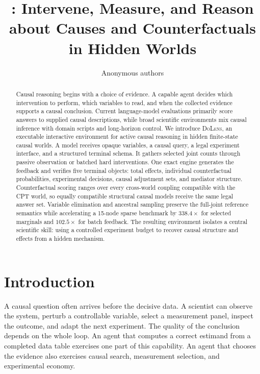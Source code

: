 \documentclass{article}
\title{\method: Intervene, Measure, and Reason\\
about Causes and Counterfactuals\\
in Hidden Worlds}
\author{Anonymous authors}
\newcommand{\method}{\textsc{DoLens}}
\begin{document}
\maketitle

\begin{abstract}
Causal reasoning begins with a choice of evidence. A capable agent decides which
intervention to perform, which variables to read, and when the collected evidence
supports a causal conclusion. Current language-model evaluations primarily score
answers to supplied causal descriptions, while broad scientific environments mix
causal inference with domain scripts and long-horizon control. We introduce
\method, an executable interactive environment for active causal reasoning in
hidden finite-state causal worlds. A model receives opaque variables, a causal
query, a legal
experiment interface, and a structured terminal schema. It gathers selected joint
counts through passive observation or batched hard interventions. One exact engine
generates the feedback and verifies five terminal objects: total effects,
individual counterfactual probabilities, experimental decisions, causal adjustment sets,
and mediator structure. Counterfactual scoring ranges over every cross-world
coupling compatible with the CPT world, so equally compatible structural causal
models receive the same legal answer set. Variable elimination and ancestral
sampling preserve the full-joint reference semantics while accelerating a 15-node sparse
benchmark by $338.4\times$ for selected marginals and $102.5\times$ for batch
feedback. The resulting environment isolates a central scientific skill: using a
controlled experiment budget to recover causal structure and effects from a hidden
mechanism.
\end{abstract}

\section{Introduction}

A causal question often arrives before the decisive data. A scientist can observe
the system, perturb a controllable variable, select a measurement panel, inspect
the outcome, and adapt the next experiment. The quality of the conclusion depends
on the whole loop. An agent that computes a correct estimand from a completed data
table exercises one part of this capability. An agent that chooses the evidence
also exercises causal search, measurement selection, and experimental economy.
\end{document}

